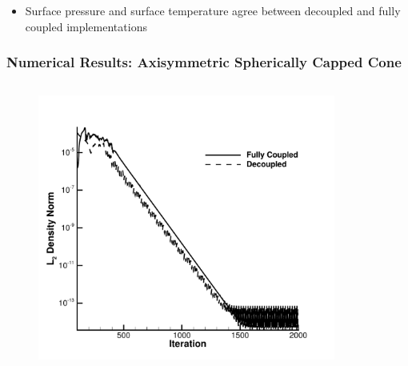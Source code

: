 \documentclass{beamer}
\begin{document}
\begin{frame}
\begin{columns}[t]
\begin{column}{0.5\textwidth}
\begin{figure}[h!]
        \end{figure}
      \end{column}
    \end{columns}
    \begin{itemize}
      \item Surface pressure and surface temperature agree between decoupled and
        fully coupled implementations
    \end{itemize}
\end{frame}
\begin{frame}
  \frametitle{Numerical Results: Axisymmetric Spherically Capped Cone}
    \begin{columns}[t]
      \begin{column}{0.5\textwidth}
        \begin{figure}[h!]
    	  \includegraphics[width=\textwidth]{figures/cone_iteration}
        \end{figure}
      \end{column}
      \begin{column}{0.5\textwidth}
        \begin{figure}[h!]

\end{figure}
\end{column}
\end{columns}
\end{frame}
\end{document}
